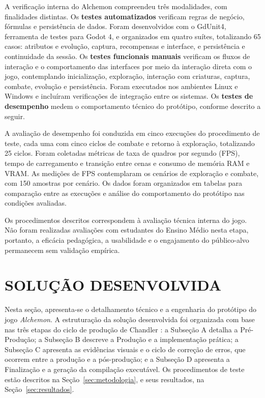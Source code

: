 A verificação interna do Alchemon compreendeu três modalidades, com finalidades distintas.
Os \textbf{testes automatizados} verificam regras de negócio, fórmulas e persistência de dados. Foram desenvolvidos com o GdUnit4, ferramenta de testes para Godot 4, e organizados em quatro suítes, totalizando 65 casos: atributos e evolução, captura, recompensas e interface, e persistência e continuidade da sessão.
Os \textbf{testes funcionais manuais} verificam os fluxos de interação e o comportamento das interfaces por meio da interação direta com o jogo, contemplando inicialização, exploração, interação com criaturas, captura, combate, evolução e persistência. Foram executados nos ambientes Linux e Windows e incluíram verificações de integração entre os sistemas.
Os \textbf{testes de desempenho} medem o comportamento técnico do protótipo, conforme descrito a seguir.

A avaliação de desempenho foi conduzida em cinco execuções do procedimento de teste, cada uma com cinco ciclos de combate e retorno à exploração, totalizando 25 ciclos. Foram coletadas métricas de taxa de quadros por segundo (FPS), tempo de carregamento e transição entre cenas e consumo de memória RAM e VRAM. As medições de FPS contemplaram os cenários de exploração e combate, com 150 amostras por cenário. Os dados foram organizados em tabelas para comparação entre as execuções e análise do comportamento do protótipo nas condições avaliadas.

Os procedimentos descritos correspondem à avaliação técnica interna do jogo. Não foram realizadas avaliações com estudantes do Ensino Médio nesta etapa, portanto, a eficácia pedagógica, a usabilidade e o engajamento do público-alvo permanecem sem validação empírica.




\section{SOLUÇÃO DESENVOLVIDA}
Nesta seção, apresenta-se o detalhamento técnico e a engenharia do protótipo do jogo \textit{Alchemon}. A estruturação da solução desenvolvida foi organizada com base nas três etapas do ciclo de produção de Chandler \cite{Chandler2009}: a Subseção A detalha a Pré-Produção; a Subseção B descreve a Produção e a implementação prática; a Subseção C apresenta as evidências visuais e o ciclo de correção de erros, que ocorrem entre a produção e a pós-produção; e a Subseção D apresenta a Finalização e a geração da compilação executável. Os procedimentos de teste estão descritos na Seção~\ref{sec:metodologia}, e seus resultados, na Seção~\ref{sec:resultados}.

